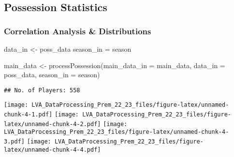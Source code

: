 \documentclass[
]{article}
\newenvironment{Shaded}{\begin{snugshade}}{\end{snugshade}}
\newcommand{\AttributeTok}[1]{\textcolor[rgb]{0.77,0.63,0.00}{#1}}
\newcommand{\FunctionTok}[1]{\textcolor[rgb]{0.00,0.00,0.00}{#1}}
\newcommand{\NormalTok}[1]{#1}
\newcommand{\OtherTok}[1]{\textcolor[rgb]{0.56,0.35,0.01}{#1}}
\begin{document}
\hypertarget{possession-statistics}{%
\subsection{Possession Statistics}\label{possession-statistics}}

\hypertarget{correlation-analysis-distributions-1}{%
\subsubsection{Correlation Analysis \&
Distributions}\label{correlation-analysis-distributions-1}}

\begin{Shaded}
\begin{Highlighting}[]
\NormalTok{data\_in }\OtherTok{\textless{}{-}}\NormalTok{ poss\_data}
\NormalTok{season\_in }\OtherTok{=}\NormalTok{ season}

\NormalTok{main\_data }\OtherTok{\textless{}{-}} \FunctionTok{processPossession}\NormalTok{(}\AttributeTok{main\_data\_in =}\NormalTok{ main\_data, }\AttributeTok{data\_in =}\NormalTok{ poss\_data, }\AttributeTok{season\_in =}\NormalTok{ season)}
\end{Highlighting}
\end{Shaded}

\begin{verbatim}
## No. of Players: 558
\end{verbatim}

\texttt{[image: LVA\_DataProcessing\_Prem\_22\_23\_files/figure-latex/unnamed-chunk-4-1.pdf]}
\texttt{[image: LVA\_DataProcessing\_Prem\_22\_23\_files/figure-latex/unnamed-chunk-4-2.pdf]}
\texttt{[image: LVA\_DataProcessing\_Prem\_22\_23\_files/figure-latex/unnamed-chunk-4-3.pdf]}
\texttt{[image: LVA\_DataProcessing\_Prem\_22\_23\_files/figure-latex/unnamed-chunk-4-4.pdf]}
\end{document}
